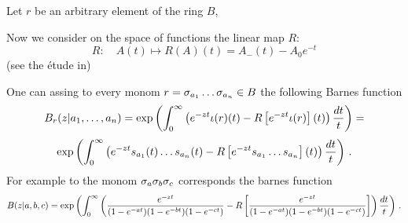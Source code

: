   
Let $r$ be an arbitrary element of the ring $B$,
     
 Now we consider on the space of functions the linear map $R$:
          $$
R\colon\quad A(t)\mapsto R(A)(t)=A_-(t)-A_0e^{-t}
          $$
(see the \'etude in)


One can assing to every monom $r=\sigma_{a_1}\dots{\sigma}_{a_n}\in B$ 
the following Barnes function
            $$
  B_r(z|a_1,\dots,a_n)=\exp
               \left(
          \int_0^\infty 
          \left(
       e^{-zt}\iota(r)(t)-R\left[e^{-zt}\iota(r)\right](t)
            \right){dt\over t}
               \right)=
            $$  
               $$
                \exp
               \left(
          \int_0^\infty 
          \left(
       e^{-zt}s_{a_1}(t)\dots s_{a_n}(t)-
          R\left[e^{-zt}s_{a_1}\dots s_{a_n}\right](t)
            \right){dt\over t}
               \right)\,.
            $$
For example to the monom ${\sigma}_a{\sigma}_b{\sigma}_c$ corresponds the barnes function
          $$
   B(z|a,b,c)=   \exp
               \left(
          \int_0^\infty 
          \left(
          {e^{-zt}\over (1-e^{-at})(1-e^{-bt})(1-e^{-ct})}-
          R\left[{e^{-zt}\over (1-e^{-at})(1-e^{-bt})(1-e^{-ct})}\right]
            \right){dt\over t}
               \right)\,.
          $$

 \bye

